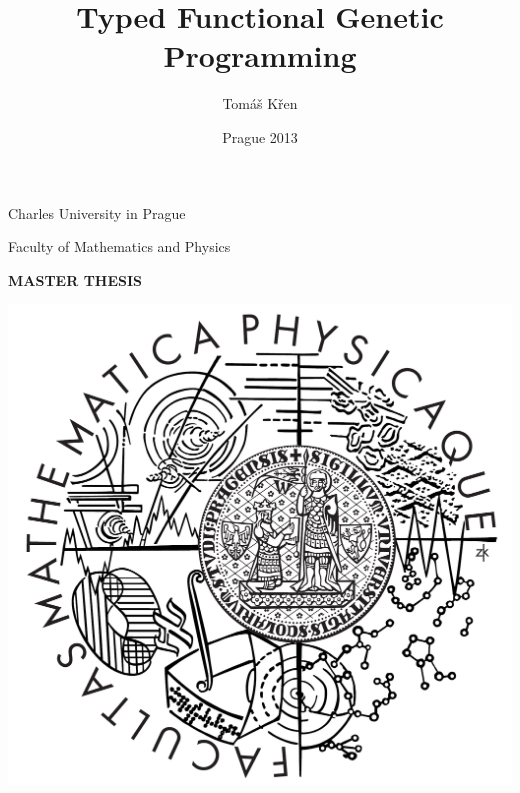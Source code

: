 \documentclass[12pt,a4paper]{report}
\title{Typed Functional Genetic Programming}
\author{Tomáš Křen}
\date{Prague 2013}
\begin{document}


\pagestyle{empty}
\begin{center}

\large

Charles University in Prague 

\medskip

Faculty of Mathematics and Physics

\vfill

{\bf\Large MASTER THESIS}

\vfill



\includegraphics[scale=0.15]{logomff.png}

\vfill
\vspace{5mm}


\end{center}
\end{document}
